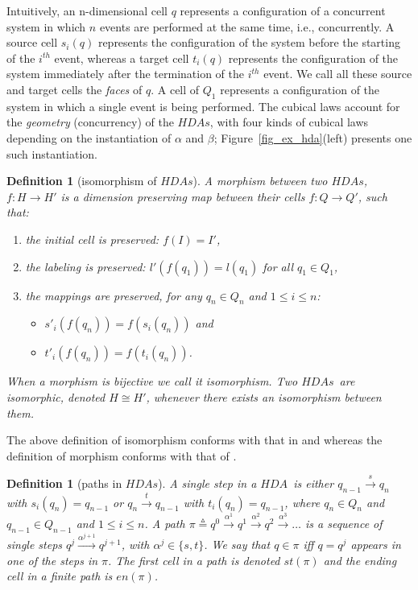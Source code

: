 \documentclass[submission,copyright,creativecommons]{eptcs}
\newtheorem{definition}[theorem]{Definition}
\newcommand\HDA{\ensuremath{\mathit{HDA}}}
\newcommand\HDAs{\ensuremath{\mathit{HDAs}}}
\newcommand\defequal{\ensuremath{\stackrel{\vartriangle}{=}}}
\newcommand\isomorphicHDA{\ensuremath{\cong}}
\newcommand\finishPath[1]{\ensuremath{\mathit{en}(#1)}}
\newcommand\startPath[1]{\ensuremath{\mathit{st}(#1)}}
\newcommand{\transition}[1]{\ensuremath{\xrightarrow{#1}}}
\begin{document}
Intuitively, an n-dimensional cell $q$ represents a configuration of a concurrent system in which $n$ events are performed at the same time, i.e., concurrently. A source cell $s_{i}(q)$ represents the configuration of the system before the starting of the $i^{th}$ event, whereas a target cell $t_{i}(q)$ represents the configuration of the system immediately after the termination of the $i^{th}$ event. We call all these source and target cells the \emph{faces} of $q$.
A cell of $Q_{1}$ represents a configuration of the system in which a single event is being performed.
The cubical laws account for the \textit{geometry} (concurrency) of the \HDAs, with four kinds of cubical laws depending on the instantiation of $\alpha$ and $\beta$; Figure~\ref{fig_ex_hda}(left) presents one such instantiation.






\begin{definition}[isomorphism of \HDAs]\label{def_isomorphismHDA}
A \emph{morphism} between two \HDAs, $f:H\rightarrow H'$ is a dimension preserving map between their cells $f:Q\rightarrow Q'$, such that:
\begin{enumerate}
\item\label{def_isomorphismHDA_1} the initial cell is preserved: $f(I)=I'$,
\item\label{def_isomorphismHDA_2} the labeling is preserved: $l'(f(q_{1}))=l(q_{1})$ for all $q_{1}\in Q_{1}$,
\item\label{def_isomorphismHDA_3} the mappings are preserved, for any $q_{n}\in Q_{n}$ and $1\leq i\leq n$:
\begin{itemize}
\item $s'_{i}(f(q_{n}))=f(s_{i}(q_{n}))$ and
\item $t'_{i}(f(q_{n}))=f(t_{i}(q_{n}))$.
\end{itemize}
\end{enumerate}
When a morphism is bijective we call it \emph{isomorphism}. Two \HDAs\ are isomorphic, denoted $H\isomorphicHDA H'$, whenever there exists an isomorphism between them.
\end{definition}

The above definition of isomorphism conforms with that in \cite[Def.2]{Glabbeek06HDA} and whereas the definition of morphism conforms with that of \cite[Sec.1.1]{Goubault12Category_Cubical}.



\begin{definition}[paths in \HDAs]\label{def_paths_HDA}
A \emph{single step} in a \HDA\ is either $q_{n-1}\transition{s}q_{n}$ with $s_{i}(q_{n})=q_{n-1}$ or $q_{n}\transition{t}q_{n-1}$ with $t_{i}(q_{n})=q_{n-1}$, where $q_{n}\in Q_{n}$ and $q_{n-1}\in Q_{n-1}$ and $1\leq i\leq n$. A \emph{path} $\pi\defequal q^{0}\transition{\alpha^{1}}q^{1}\transition{\alpha^{2}}q^{2}\transition{\alpha^{3}}\dots$ is a sequence of single steps $q^{j}\transition{\alpha^{j+1}}q^{j+1}$, with $\alpha^{j}\in\{s,t\}$. 
We say that $q\in\pi$ iff $q=q^{j}$ appears in one of the steps in $\pi$. 
The first cell in a path is denoted $\startPath{\pi}$ and the ending cell in a finite path is $\finishPath{\pi}$. 
\end{definition}
\end{document}
